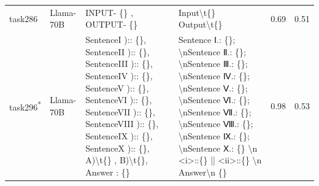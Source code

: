 \begin{longtable}{@{}p{0.8cm\tiny}p{1cm\tiny}p{4.1cm\ttfamily\tiny}p{4.1cm\ttfamily\tiny}p{0.8cm\tiny}p{0.8cm\tiny}@{}}
task286   & Llama-70B  & INPUT- \{\} , OUTPUT- \{\}                                                                                                                                                                                                                                                                                                                                                                                                                                                                                              & Input\textbackslash{}t\{\} Output\textbackslash{}t\{\}                                                                                                                                                                                                                                                                                                                                                                                                                                                                                                                            & 0.69 & 0.51 \\
task296\textsuperscript{*}   & Llama-70B  & SentenceI ):: \{\}, SentenceII ):: \{\}, SentenceIII ):: \{\}, SentenceIV ):: \{\}, SentenceV ):: \{\}, SentenceVI ):: \{\}, SentenceVII ):: \{\}, SentenceVIII ):: \{\}, SentenceIX ):: \{\}, SentenceX ):: \{\}, A)\textbackslash{}t\{\} , B)\textbackslash{}t\{\}, Answer : \{\}                                                                                                                                                                                                                                     & Sentence Ⅰ.: \{\}; \textbackslash{}nSentence Ⅱ.: \{\}; \textbackslash{}nSentence Ⅲ.: \{\}; \textbackslash{}nSentence Ⅳ.: \{\}; \textbackslash{}nSentence Ⅴ.: \{\}; \textbackslash{}nSentence Ⅵ.: \{\}; \textbackslash{}nSentence Ⅶ.: \{\}; \textbackslash{}nSentence Ⅷ.: \{\}; \textbackslash{}nSentence Ⅸ.: \{\}; \textbackslash{}nSentence Ⅹ.: \{\} \textbackslash{}n \textless{}i\textgreater{}::\{\} || \textless{}ii\textgreater{}::\{\} \textbackslash{}n Answer\textbackslash{}n    \{\}                                                                                   & 0.98 & 0.53 \\

\end{longtable}
